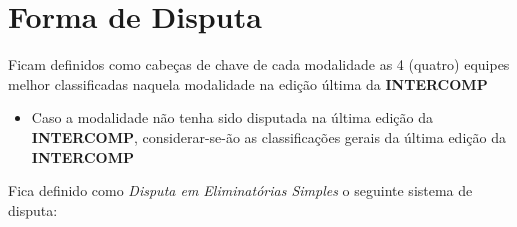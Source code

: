 {\let\clearpage\relax \chapter{Forma de Disputa}}

\noindent
Ficam definidos como cabeças de chave de cada modalidade as 4 (quatro) equipes melhor classificadas naquela modalidade na edição última da \textbf{INTERCOMP}
\begin{itemize}[noitemsep]
	\item Caso a modalidade não tenha sido disputada na última edição da \textbf{INTERCOMP}, considerar-se-ão as classificações gerais da última edição da \textbf{INTERCOMP}
\end{itemize}

\noindent
Fica definido como \textit{Disputa em Eliminatórias Simples} o seguinte sistema de disputa:
